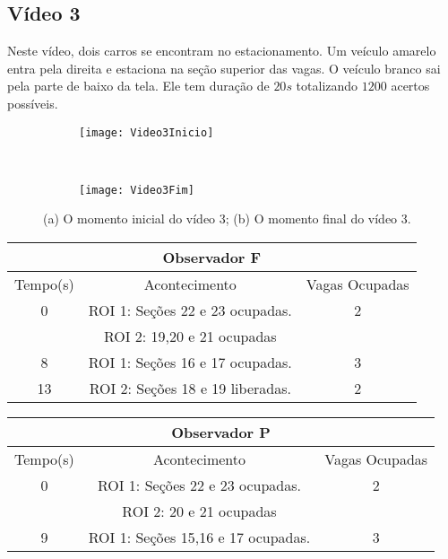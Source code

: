 \subsection{Vídeo 3}

Neste vídeo, dois carros se encontram no estacionamento. Um veículo amarelo entra pela direita e estaciona na seção superior das vagas. O veículo branco sai pela parte de baixo da tela. Ele tem duração de $20s$ totalizando $1200$ acertos possíveis.

\begin{figure}[!h]
\centering
\begin{subfigure}{.5\textwidth}
\centering
\texttt{[image: Video3Inicio]}
\caption{}
\end{subfigure}\
\begin{subfigure}{.5\textwidth}
\centering
\texttt{[image: Video3Fim]}
\caption{}
\end{subfigure}
\centering
\caption{(a) O momento inicial do vídeo 3; (b) O momento final do vídeo 3.}%
\label{}%
\end{figure}

\begin{center}
\begin{tabular}{|c||c||c|}
\hline
\multicolumn{3}{|c|}{Observador F}  \\ \hline \hline
Tempo(s) & Acontecimento & Vagas Ocupadas\\ \hline
0 & ROI 1: Seções 22 e 23 ocupadas. & 2 \\
 & ROI 2: 19,20 e 21 ocupadas & \\ \hline
8 & ROI 1: Seções 16 e 17 ocupadas. & 3\\ \hline
13 & ROI 2: Seções 18 e 19 liberadas. & 2\\
\hline
\end{tabular}
\end{center}

\begin{center}
\begin{tabular}{|c||c||c|}
\hline
\multicolumn{3}{|c|}{Observador P}  \\ \hline \hline
Tempo(s) & Acontecimento & Vagas Ocupadas\\ \hline
0 & ROI 1: Seções 22 e 23 ocupadas. & 2 \\
 & ROI 2: 20 e 21 ocupadas &  \\ \hline
9 & ROI 1: Seções 15,16 e 17 ocupadas. & 3 \\
\hline
\end{tabular}
\end{center}

